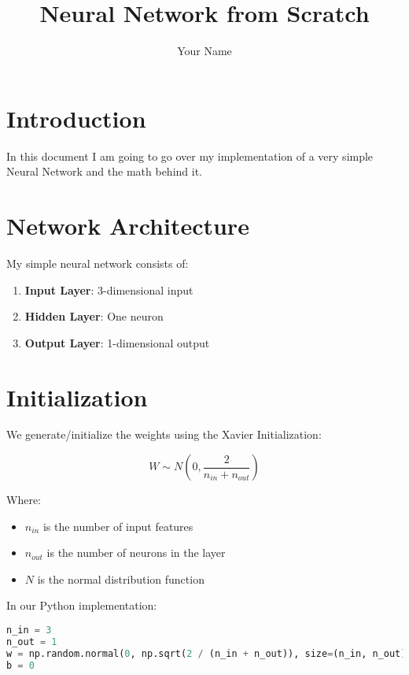 \documentclass{article}
\title{Neural Network from Scratch}
\author{Your Name}
\date{}
\begin{document}
\maketitle

\section{Introduction}

In this document I am going to go over my implementation of a very simple Neural Network and the math behind it.

\section{Network Architecture}

My simple neural network consists of:

\begin{enumerate}
    \item \textbf{Input Layer}: 3-dimensional input
    \item \textbf{Hidden Layer}: One neuron
    \item \textbf{Output Layer}: 1-dimensional output
\end{enumerate}

\section{Initialization}

We generate/initialize the weights using the Xavier Initialization:

\begin{equation}
    W \sim N(0, \frac{2}{n_{in} + n_{out}})
\end{equation}

Where:
\begin{itemize}
    \item $n_{in}$ is the number of input features
    \item $n_{out}$ is the number of neurons in the layer
    \item $N$ is the normal distribution function
\end{itemize}

In our Python implementation:

\begin{lstlisting}[language=Python]
n_in = 3
n_out = 1
w = np.random.normal(0, np.sqrt(2 / (n_in + n_out)), size=(n_in, n_out))
b = 0
\end{lstlisting}
\end{document}
